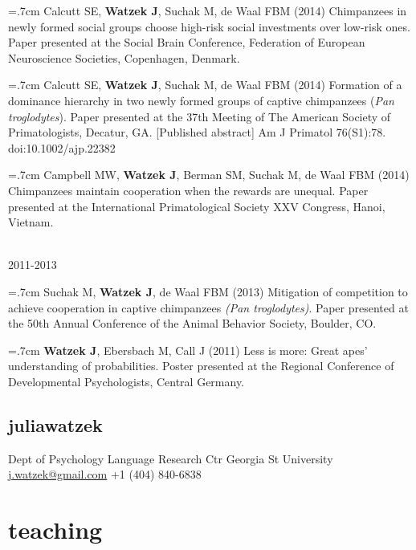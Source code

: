 \documentclass[]{friggeri-cv}
\begin{document}
\hangindent=.7cm Calcutt SE, \textbf{Watzek J}, Suchak M, de Waal FBM (2014) Chimpanzees in newly formed social groups choose high-risk social investments over low-risk ones. Paper presented at the Social Brain Conference, Federation of European Neuroscience Societies, Copenhagen, Denmark.

\hangindent=.7cm Calcutt SE, \textbf{Watzek J}, Suchak M, de Waal FBM (2014) Formation of a dominance hierarchy in two newly formed groups of captive chimpanzees (\emph{Pan troglodytes}). Paper presented at the 37th Meeting of The American Society of Primatologists, Decatur, GA. [Published abstract] Am J Primatol 76(S1):78. doi:10.1002/ajp.22382

\hangindent=.7cm Campbell MW, \textbf{Watzek J}, Berman SM, Suchak M, de Waal FBM (2014) Chimpanzees maintain cooperation when the rewards are unequal. Paper presented at the International Primatological Society XXV Congress, Hanoi, Vietnam.

{\large{} ~\\[-.15cm] 2011-2013}

\hangindent=.7cm Suchak M, \textbf{Watzek J}, de Waal FBM (2013) Mitigation of competition to achieve cooperation in captive chimpanzees \emph{(Pan troglodytes)}. Paper presented at the 50th Annual Conference of the Animal Behavior Society, Boulder, CO.

\hangindent=.7cm \textbf{Watzek J}, Ebersbach M, Call J (2011) Less is more: Great apes' understanding of probabilities. Poster presented at the Regional Conference of Developmental Psychologists, Central Germany.\\[-.1cm]


\begin{aside}
  \section{{\normalfont julia}watzek}
    Dept of Psychology
    Language Research Ctr
    Georgia St University
    ~
    \href{mailto:j.watzek@gmail.com}{j.watzek@gmail.com}
    +1 (404) 840-6838
\end{aside}

\newpage
\thispagestyle{fancy}

\section{teaching}
\end{document}
